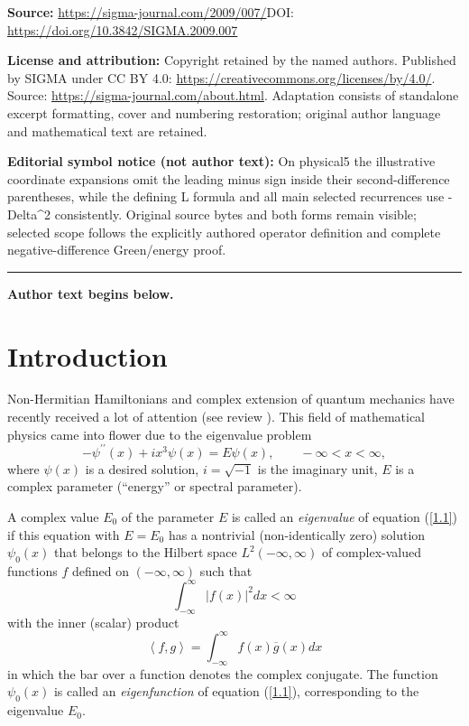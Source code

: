 \documentclass[11pt]{article}
\numberwithin{equation}{section}
\begin{document}
\noindent\textbf{Source:} \url{https://sigma-journal.com/2009/007/}\quad DOI: \url{https://doi.org/10.3842/SIGMA.2009.007}\par
\noindent\textbf{License and attribution:} Copyright retained by the named authors. Published by SIGMA under CC BY 4.0: \url{https://creativecommons.org/licenses/by/4.0/}. Source: \url{https://sigma-journal.com/about.html}. Adaptation consists of standalone excerpt formatting, cover and numbering restoration; original author language and mathematical text are retained.\par
\noindent\textbf{Editorial symbol notice (not author text):} On physical5 the illustrative coordinate expansions omit the leading minus sign inside their second-difference parentheses, while the defining L formula and all main selected recurrences use -Delta\textasciicircum{}2 consistently. Original source bytes and both forms remain visible; selected scope follows the explicitly authored operator definition and complete negative-difference Green/energy proof.\par
\medskip\hrule\medskip\noindent\textbf{Author text begins below.}\par
\setcounter{section}{0}
\setcounter{subsection}{0}
\setcounter{subsubsection}{0}
\setcounter{equation}{0}
\section{Introduction}\label{section1}

Non-Hermitian Hamiltonians and complex extension of quantum mechanics have
recently received a lot of attention (see review \cite{[1]}). This f\/ield of
mathematical physics came into f\/lower due to the eigenvalue problem%
\begin{equation}
-\psi ^{\prime \prime }(x)+ix^{3}\psi (x)=E\psi (x),\qquad -\infty
<x<\infty ,  \label{1.1}
\end{equation}%
where $\psi (x)$ is a desired solution, $i=\sqrt{-1}$ is the imaginary unit,
$E$ is a complex parameter (``energy'' or spectral parameter).

A complex value $E_{0}$ of the parameter $E$ is called an \textit{eigenvalue}
of equation (\ref{1.1}) if this equation with $E=E_{0}$ has a nontrivial
(non-identically zero) solution $\psi _{0}(x)$ that belongs to the Hilbert
space $L^{2}(-\infty ,\infty )$ of complex-valued functions $f$ def\/ined on $%
(-\infty ,\infty )$ such that%
\[
\int_{-\infty }^{\infty }\left\vert f(x)\right\vert ^{2}dx<\infty
\]%
with the inner (scalar) product%
\begin{equation}
\left\langle f,g\right\rangle =\int_{-\infty }^{\infty }f(x)\overline{g}(x)dx
\label{1.2}
\end{equation}%
in which the bar over a function denotes the complex conjugate. The function
$\psi _{0}(x)$ is called an \textit{eigenfunction} of equation (\ref{1.1}),
corresponding to the eigenvalue $E_{0}.$
\end{document}
